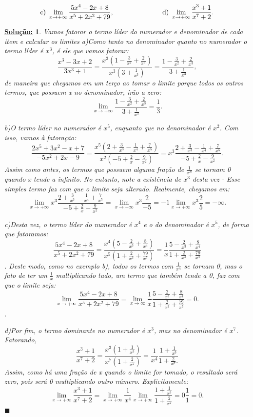 \documentclass{article}
\newtheorem*{sol*}{\underline{Solu\c c\~ao:}}
\renewcommand\qedsymbol{$\blacksquare$}
\begin{document}
$$
\text{c) }\lim_{x\to+\infty}\frac{5x^4 - 2x + 8}{x^5 + 2x^2 + 79},\hspace{2.5cm}
\text{d) }\lim_{x\to+\infty}\frac{x^3 + 1}{x^7 + 2}.
$$
\begin{sol*}
Vamos fatorar o termo l\'ider do numerador e denominador de cada item e calcular os limites
a)Como tanto no denominador quanto no numerador o termo l\'ider \'e $x^3$, \'e ele que vamos fatorar:
$$
\frac{x^3 - 3x + 2}{3x^3 + 1} = \frac{x^3 (1 - \frac{3}{x^2} + \frac{2}{x^3})}{x^3(3 + \frac{1}{x^3})} = \frac{1 - \frac{3}{x^2} + \frac{2}{x^3}}{3 + \frac{1}{x^3}},
$$
de maneira que chegamos em um ter\c co ao tomar o limite porque todos os outros termos, que possuem x no denominador, ir\~ao a zero:
$$
\lim_{x\to+\infty}\frac{1 - \frac{3}{x^2} + \frac{2}{x^3}}{3 + \frac{1}{x^3}} = \frac{1}{3}.
$$

b)O termo l\'ider no numerador \'e $x^5$, enquanto que no denominador \'e $x^2$. Com isso, vamos \`a fatora\c c\~ao:
$$
\frac{2x^5 + 3x^2 - x + 7}{-5x^2 + 2x - 9} = \frac{x^5(2 + \frac{3}{x^3} - \frac{1}{x^4} + \frac{7}{x^5})}{x^2(-5 + \frac{2}{x} - \frac{9}{x^2})} = x^3\frac{2 + \frac{3}{x^3} - \frac{1}{x^4} + \frac{7}{x^5}}{-5 + \frac{2}{x} - \frac{9}{x^2}}.
$$
Assim como antes, os termos que possuem alguma fra\c c\~ao de $\frac{1}{x^n}$ se tornam 0 quando x tende a infinito. No entanto, note a exist\^encia de $x^3$ desta vez - Esse simples termo faz com que o limite seja alterado. Realmente, chegamos em:
$$
\lim_{x\to+\infty}x^3\frac{2 + \frac{3}{x^3} - \frac{1}{x^4} + \frac{7}{x^5}}{-5 + \frac{2}{x} - \frac{9}{x^2}} = \lim_{x\to+\infty}x^3\frac{2}{-5} = -1\lim_{x\to+\infty}x^3\frac{2}{5} = -\infty.
$$

c)Desta vez, o termo l\'ider do numerador \'e $x^4$ e o do denominador \'e $x^5$, de forma que fatoramos:
$$
\frac{5x^4 - 2x + 8}{x^5 + 2x^2 + 79} = \frac{x^4(5 - \frac{2}{x^3} + \frac{8}{x^4})}{x^5(1 + \frac{2}{x^3} + \frac{79}{x^5})} = \frac{1}{x}\frac{5 - \frac{2}{x^3} + \frac{8}{x^4}}{1 + \frac{2}{x^3} + \frac{79}{x^5}}
$$.
Deste modo, como no exemplo b), todos os termos com $\frac{1}{x^n}$ se tornam 0, mas o fato de ter um $\frac{1}{x}$ multiplicando tudo, um termo que tamb\'em tende a 0, faz com que o limite seja:
$$
\lim_{x\to+\infty}\frac{5x^4 - 2x + 8}{x^5 + 2x^2 + 79} = \lim_{x\to\infty}\frac{1}{x}\frac{5 - \frac{2}{x^3} + \frac{8}{x^4}}{1 + \frac{2}{x^3} + \frac{79}{x^5}} = 0.
$$.

d)Por fim, o termo dominante no numerador \'e $x^3$, mas no denominador \'e $x^7$. Fatorando,
$$
\frac{x^3 + 1}{x^7 + 2} = \frac{x^3(1 + \frac{1}{x^3})}{x^7(1 + \frac{2}{x^7})} = \frac{1}{x^4}\frac{1 + \frac{1}{x^3}}{1 + \frac{2}{x^7}.}
$$
Assim, como h\'a uma fra\c c\~ao de x quando o limite for tomado, o resultado ser\'a zero, pois ser\'a 0 multiplicando outro n\'umero. Explicitamente:
$$
\lim_{x\to+\infty}\frac{x^3 + 1}{x^7 + 2} = \lim_{x\to+\infty}\frac{1}{x^4}\lim_{x\to+\infty}\frac{1 + \frac{1}{x^3}}{1 + \frac{2}{x^7}} = 0\frac{1}{1} = 0.
$$
\qedsymbol
\end{sol*}
\end{document}
